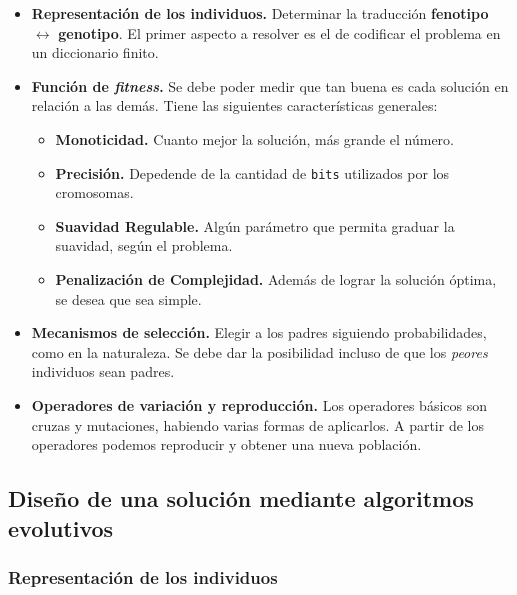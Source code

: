 \documentclass[10pt,a4paper]{article}
\begin{document}
\begin{itemize}
\item \textbf{Representación de los individuos.} Determinar la traducción \textbf{fenotipo} $\leftrightarrow$ \textbf{genotipo}. El primer aspecto a resolver es el de codificar el problema en un diccionario finito.
\item \textbf{Función de \textit{fitness}.} Se debe poder medir que tan buena es cada solución en relación a las demás. Tiene las siguientes características generales:
\begin{itemize}
\item \textbf{Monoticidad.} Cuanto mejor la solución, más grande el número.
\item \textbf{Precisión.} Depedende de la cantidad de \texttt{bits} utilizados por los cromosomas.
\item \textbf{Suavidad Regulable.} Algún parámetro que permita graduar la suavidad, según el problema.
\item \textbf{Penalización de Complejidad.} Además de lograr la solución óptima, se desea que sea simple.
\end{itemize}
\item \textbf{Mecanismos de selección.} Elegir a los padres siguiendo probabilidades, como en la naturaleza. Se debe dar la posibilidad incluso de que los \textit{peores} individuos sean padres.
\item \textbf{Operadores de variación y reproducción.} Los operadores básicos son cruzas y mutaciones, habiendo varias formas de aplicarlos. A partir de los operadores podemos reproducir y obtener una nueva población.
\end{itemize}

\subsection{Diseño de una solución mediante algoritmos evolutivos}

\subsubsection{Representación de los individuos}
\end{document}
